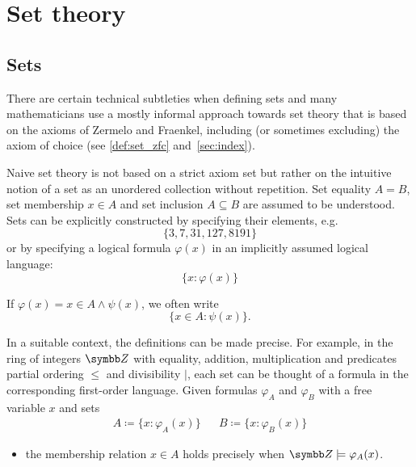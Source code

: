 \section{Set theory}\label{sec:set_theory}
\subsection{Sets}\label{subsec:sets}

There are certain technical subtleties when defining sets and many mathematicians use a mostly informal approach towards set theory that is based on the axioms of Zermelo and Fraenkel, including (or sometimes excluding) the axiom of choice (see \ref{def:set_zfc} and~\cref{sec:index}).

\begin{definition}\label{def:set_naive}\cite[Chapter 1]{Enderton1977}
  Naive set theory is not based on a strict axiom set but rather on the intuitive notion of a set as an unordered collection without repetition. Set equality \( A = B \), set membership \( x \in A \) and set inclusion \( A \subseteq B \) are assumed to be understood. Sets can be explicitly constructed by specifying their elements, e.g.
  \begin{equation*}
    \{ 3, 7, 31, 127, 8191 \}
  \end{equation*}
  or by specifying a logical formula \( \varphi(x) \) in an implicitly assumed logical language:
  \begin{equation*}
    \{ x \colon \varphi(x) \}
  \end{equation*}

  If \( \varphi(x) = x \in A \land \psi(x) \), we often write
  \begin{equation*}
    \{ x \in A \colon \psi(x) \}.
  \end{equation*}

  In a suitable context, the definitions can be made precise. For example, in the ring of integers \( \BB{Z} \) with equality, addition, multiplication and predicates partial ordering \( \leq \) and divisibility \( \vert \), each set can be thought of a formula in the corresponding first-order language. Given formulas \( \varphi_A \) and \( \varphi_B \) with a free variable \( x \) and sets
  \begin{align*}
    A \coloneqq \{ x \colon \varphi_A(x) \} && B \coloneqq \{ x \colon \varphi_B(x) \}
  \end{align*}

  \begin{itemize}
    \item the membership relation \( x \in A \) holds precisely when \( \BB{Z} \models \varphi_A(x) \).


\end{itemize}
\end{definition}

